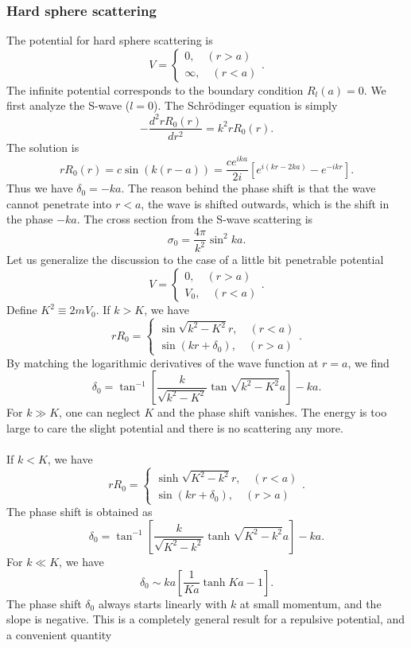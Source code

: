 \subsubsection{Hard sphere scattering}
The potential for hard sphere scattering is
\[V = \begin{cases} 0 , \quad (r > a) \\ \infty , \quad (r < a)\end{cases}.\]
The infinite potential corresponds to the boundary condition $R_l(a) = 0$. We first analyze the S-wave ($l = 0$). The Schr\"{o}dinger equation is simply 
\[-\frac{d^2 rR_0(r)}{dr^2} = k^2 rR_0(r).\]
The solution is
\[rR_0(r) = c\sin(k(r-a)) = \frac{ce^{ika}}{2i} \left[ e^{i(kr-2ka)} - e^{-ikr} \right].\]
Thus we have $\delta_0 = -ka$. The reason behind the phase shift is that the wave cannot penetrate into $r < a$, the wave is shifted outwards, which is the shift in the phase $-ka$. The cross section from the S-wave scattering is
\[\sigma_0 = \frac{4\pi}{k^2}\sin^2 ka.\]
Let us generalize the discussion to the case of a little bit penetrable potential
\[V = \begin{cases} 0 , \quad (r > a) \\ V_0 , \quad (r < a)\end{cases}.\]
Define $K^2 \equiv 2mV_0$. If $k > K$, we have
\[rR_0 = \begin{cases} \sin \sqrt{k^2-K^2}r , \quad (r < a) \\ \sin(kr+\delta_0) , \quad (r > a)\end{cases}.\]
By matching the logarithmic derivatives of the wave function at $r = a$, we find
\[\delta_0 = \tan^{-1} \left[\frac{k}{\sqrt{k^2-K^2}} \tan\sqrt{k^2-K^2}a \right]-ka.\]
For $k \gg K$, one can neglect $K$ and the phase shift vanishes. The energy is too large to care the slight potential and there is no scattering any more.
\\ \\
If $k < K$, we have
\[rR_0 = \begin{cases} \sinh \sqrt{K^2-k^2}r , \quad (r < a) \\ \sin(kr+\delta_0) , \quad (r > a)\end{cases}.\]
The phase shift is obtained as
\[\delta_0 = \tan^{-1} \left[\frac{k}{\sqrt{K^2-k^2}} \tanh\sqrt{K^2-k^2}a \right]-ka.\]
For $k \ll K$, we have
\[\delta_0 \sim ka \left[ \frac{1}{Ka} \tanh Ka - 1 \right].\]
The phase shift $\delta_0$ always starts linearly with $k$ at small momentum, and the slope is negative. This is a completely general result for a repulsive potential, and a convenient quantity
